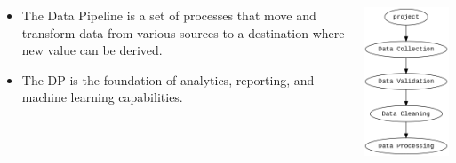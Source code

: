 \documentclass[aspectratio=169]{beamer} %
\begin{document}
\begin{frame}{}
    \begin{columns}
    \begin{column}{0.5\textwidth}
        \begin{itemize}
            \item The Data Pipeline is a set of processes that move and transform data from various sources to a destination where new value can be derived.
            \item The DP is the foundation of analytics, reporting, and machine learning capabilities.
        \end{itemize}
    \end{column}
    \begin{column}{0.45\textwidth}
        \begin{center}
            \includegraphics[width=1.0\linewidth, height=0.7\textheight]{../images/project.png}
        \end{center}
    \end{column}
\end{columns}
\end{frame}
\end{document}
